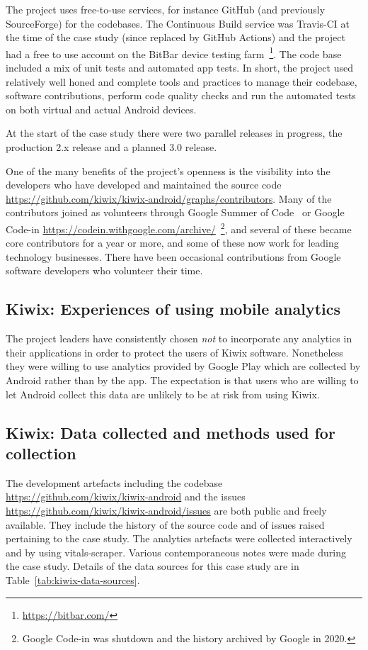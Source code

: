The project uses free-to-use services, for instance GitHub (and previously SourceForge) for the codebases. The Continuous Build service was Travis-CI at the time of the case study (since replaced by GitHub Actions) and the project had a free to use account on the BitBar device testing farm~\footnote{\url{https://bitbar.com/}}. The code base included a mix of unit tests and automated app tests. In short, the project used relatively well honed and complete tools and practices to manage their codebase, software contributions, perform code quality checks and run the automated tests on both virtual and actual Android devices.

At the start of the case study there were two parallel releases in progress, the production 2.x release and a planned 3.0 release.

One of the many benefits of the project’s openness is the visibility into the developers who have developed and maintained the source code \url{https://github.com/kiwix/kiwix-android/graphs/contributors}. Many of the contributors joined as volunteers through Google Summer of Code~\citep{google_summer_of_code} or Google Code-in \url{https://codein.withgoogle.com/archive/}~\footnote{Google Code-in was shutdown and the history archived by Google in 2020.}, and several of these became core contributors for a year or more, and some of these now work for leading technology businesses. There have been occasional contributions from Google software developers who volunteer their time.

\subsection{Kiwix: Experiences of using mobile analytics}
The project leaders have consistently chosen \emph{not} to incorporate any analytics in their applications in order to protect the users of Kiwix software. Nonetheless they were willing to use analytics provided by Google Play which are collected by Android rather than by the app. The expectation is that users who are willing to let Android collect this data are unlikely to be at risk from using Kiwix.

\subsection{Kiwix: Data collected and methods used for collection}
The development artefacts including the codebase \url{https://github.com/kiwix/kiwix-android} and the issues \url{https://github.com/kiwix/kiwix-android/issues} are both public and freely available. They include the history of the source code and of issues raised pertaining to the case study. The analytics artefacts were collected interactively and by using vitals-scraper. Various contemporaneous notes were made during the case study.  Details of the data sources for this case study are in Table~\ref{tab:kiwix-data-sources}.

